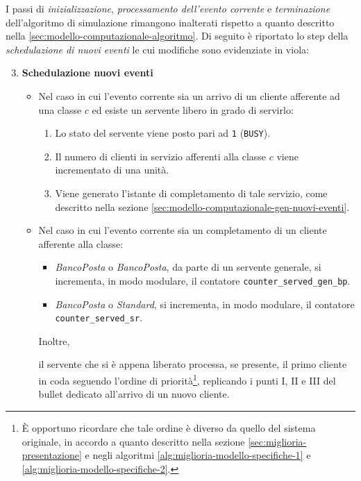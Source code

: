 I passi di \textit{inizializzazione}, \textit{processamento dell'evento corrente} e \textit{terminazione} dell'algoritmo di simulazione rimangono inalterati rispetto a quanto descritto nella \ref{sec:modello-computazionale-algoritmo}. Di seguito è riportato lo step della \textit{schedulazione di nuovi eventi} le cui modifiche sono evidenziate in {\color{purple}viola}:
\begin{enumerate}[label=Step \arabic*), align=left, leftmargin=*]
\setcounter{enumi}{2}
\item \textbf{Schedulazione nuovi eventi}
\begin{itemize}
\item Nel caso in cui l'evento corrente sia un arrivo di un cliente afferente ad una classe $c$ ed esiste un servente libero in grado di servirlo:
\begin{enumerate}[label=\Roman*.]
\item Lo stato del servente viene posto pari ad \texttt{1} (\texttt{BUSY}).
\item Il numero di clienti in servizio afferenti alla classe $c$ viene incrementato di una unità.
\item Viene generato l'istante di completamento di tale servizio, come descritto nella sezione \ref{sec:modello-computazionale-gen-nuovi-eventi}.
\end{enumerate}

\item Nel caso in cui l'evento corrente sia un completamento di un cliente afferente alla classe:
{\color{purple}
\begin{itemize}
\item \uo{} \textsl{BancoPosta} o \pp{} \textsl{BancoPosta}, da parte di un servente generale, si incrementa, in modo modulare, il contatore \texttt{counter\_served\_gen\_bp}.
\item \sr{} \textsl{BancoPosta} o \sr{} \textsl{Standard}, si incrementa, in modo modulare, il contatore \texttt{counter\_served\_sr}.
\end{itemize} 
Inoltre,} il servente che si è appena liberato processa, se presente, il primo cliente in coda seguendo l'ordine di priorità\footnote{È opportuno ricordare che tale ordine è diverso da quello del sistema originale, in accordo a quanto descritto nella sezione \ref{sec:miglioria-presentazione} e negli algoritmi \ref{alg:miglioria-modello-specifiche-1} e \ref{alg:miglioria-modello-specifiche-2}.}, replicando i punti I, II e III del bullet dedicato all'arrivo di un nuovo cliente.
\end{itemize}

\end{enumerate}

